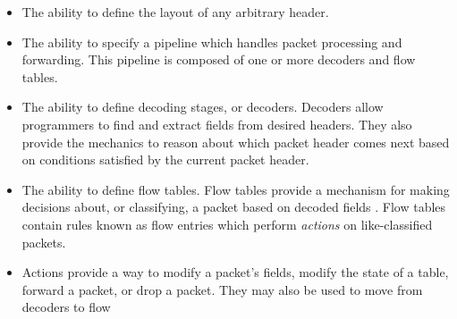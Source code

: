 \begin{itemize}
\item The ability to define the layout of any arbitrary header.

\item The ability to specify a pipeline which handles packet processing and forwarding. This pipeline is composed of one or more decoders and flow tables.

\item The ability to define decoding stages, or decoders. Decoders allow programmers to find and extract fields from desired headers. They also provide the mechanics to reason about which packet header comes next based on conditions satisfied by the current packet header.

\item The ability to define flow tables. Flow tables provide a mechanism for making decisions about, or classifying, a packet based on decoded fields \cite{openflow_spec}. Flow tables contain rules known as flow entries which perform \textit{actions} on like-classified packets.

\item
Actions provide a way to modify a packet's fields, modify the state of a table, forward a packet, or drop a packet. They may also be used to move from decoders to flow

\end{itemize}


